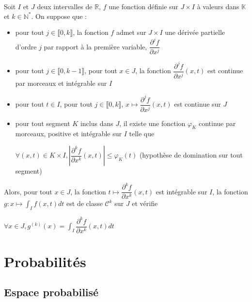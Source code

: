 \documentclass[a4paper,12pt]{book}
\newcommand{\Thr}[2]{\begin{tcolorbox}[sharp corners, colback=white,colframe=red!90!black!75, title=Théorème : #1]#2\end{tcolorbox}}
\def\R{\mathbb{R}}
\def\N{\mathbb{N}}
\def\K{\mathbb{K}}
\begin{document}
\Thr{Classe d'une intégrale à paramètre}{Soit $I$ et $J$ deux intervalles de $\R$, $f$ une fonction définie sur $J\times I$ à valeurs dans $\K$ et $k\in\N^*$. On suppose que :\begin{itemize}
\item pour tout $j\in\llbracket 0,k\rrbracket$, la fonction $f$ admet sur $J\times I$ une dérivée partielle d'ordre $j$ par rapport à la première variable, $\dfrac{\partial^j f}{\partial x^j}$
\item pour tout $j\in\llbracket 0,k-1\rrbracket$, pour tout $x\in J$, la fonction $\dfrac{\partial^j f}{\partial x^j}(x,t)$ est continue par morceaux et intégrable sur $I$
\item pour tout $t\in I$, pour tout $j\in\llbracket 0,k\rrbracket$, $x\mapsto \dfrac{\partial^j f}{\partial x^j}(x,t)$ est continue sur $J$
\item pour tout segment $K$ inclus dans $J$, il existe une fonction $\varphi_K$ continue par morceaux, positive et intégrable sur $I$ telle que \par \begin{center}$\forall (x,t)\in K\times I, \left\vert\dfrac{\partial^k f}{\partial x^k}(x,t)\right\vert\leq \varphi_K(t)$ (hypothèse de domination sur tout segment)\end{center}
\end{itemize}
Alors, pour tout $x\in J$, la fonction $t\mapsto \dfrac{\partial^kf}{\partial x^k}(x,t)$ est intégrable sur $I$, la fonction $g:x\mapsto\int_If(x,t)dt$ est de classe $\mathcal{C}^k$ sur $J$ et vérifie \par \begin{center}$\forall x\in J, g^{(k)}(x)=\int_I\dfrac{\partial^k f}{\partial x^k}(x,t)dt$\end{center}}


\chapter{Probabilités}
\section{Espace probabilisé}
\end{document}
